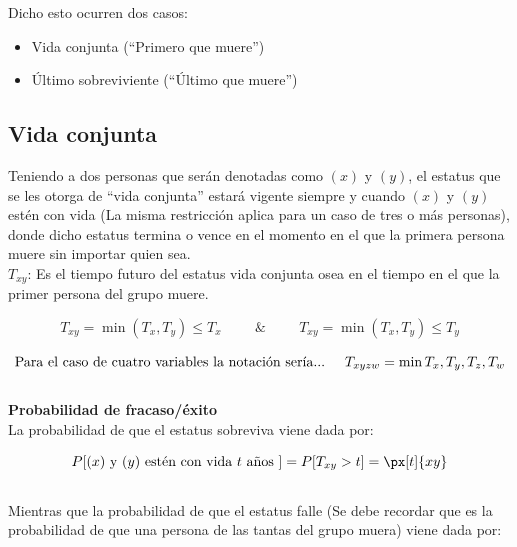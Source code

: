 \documentclass[12pt, a4paper, footinclude=true]{scrbook}
\begin{document}
Dicho esto ocurren dos casos: 

\begin{itemize}
	\item Vida conjunta (``Primero que muere'')
	\item Último sobreviviente (``Último que muere'')
\end{itemize}

\subsection{Vida conjunta}

Teniendo a dos personas que serán denotadas como $(x)$ y $(y)$, el estatus que se les otorga de ``vida conjunta'' estará vigente siempre y cuando $(x)$ y $(y)$ estén con vida (La misma restricción aplica para un caso de tres o más personas), donde dicho estatus termina o vence en el momento en el que la primera persona muere sin importar quien sea.\\ 




$T_{xy}$: Es el tiempo futuro del estatus vida conjunta osea en el tiempo en el que la primer persona del grupo muere. 

$$T_{xy} = \min(T_x, T_y) \leq T_x \hspace{1cm} \& \hspace{1cm} T_{xy} = \min(T_x, T_y) \leq T_y$$

$$\text{Para el caso de cuatro variables la notación sería...} \hspace{0.5cm} T_{xyzw} = \min{T_x, T_y, T_z, T_w}$$\\

\textbf{Probabilidad de fracaso/éxito}\\

La probabilidad de que el estatus sobreviva viene dada por: 

$$P[(x) \text{ y } (y) \text{ estén con vida } t \text{ años } ] = P[T_{xy} > t] = \px[t]{xy}$$ \\

Mientras que la probabilidad de que el estatus falle (Se debe recordar que es la probabilidad de que una persona de las tantas del grupo muera) viene dada por: 
\end{document}
